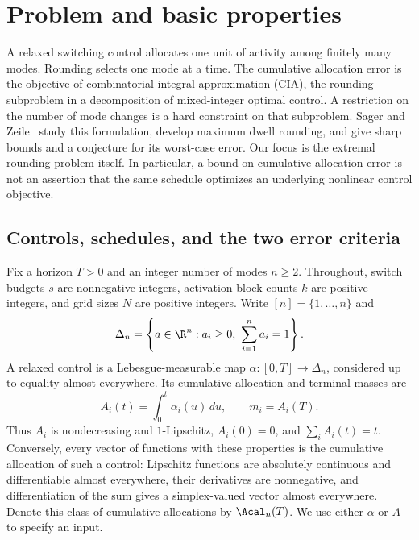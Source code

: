 \section{Problem and basic properties}\label{sec:foundations}

A relaxed switching control allocates one unit of activity among finitely many
modes. Rounding selects one mode at a time. The cumulative allocation error is
the objective of combinatorial integral approximation (CIA), the rounding
subproblem in a decomposition of mixed-integer optimal control. A restriction
on the number of mode changes is a hard constraint on that subproblem.
Sager and Zeile~\cite{sager-zeile2021} study this formulation, develop maximum
dwell rounding, and give sharp bounds and a conjecture for its worst-case
error. Our focus is the extremal rounding problem itself. In particular, a
bound on cumulative allocation error is not an assertion that the same
schedule optimizes an underlying nonlinear control objective.

\subsection{Controls, schedules, and the two error criteria}

Fix a horizon $T>0$ and an integer number of modes $n\ge2$. Throughout,
switch budgets $s$ are nonnegative integers, activation-block counts $k$ are
positive integers, and grid sizes $N$ are positive integers. Write
$[n]=\{1,\ldots,n\}$ and
\[
 \Delta_n=\left\{a\in\R^n:a_i\ge0,\ \sum_{i=1}^n a_i=1\right\}.
\]
A relaxed control is a Lebesgue-measurable map
$\alpha:[0,T]\to\Delta_n$, considered up to equality almost everywhere.
Its cumulative allocation and terminal masses are
\begin{equation}\label{eq:cumulatives}
 A_i(t)=\int_0^t\alpha_i(u)\,du,\qquad m_i=A_i(T).
\end{equation}
Thus $A_i$ is nondecreasing and $1$-Lipschitz, $A_i(0)=0$, and
$\sum_i A_i(t)=t$. Conversely, every vector of functions with these properties
is the cumulative allocation of such a control: Lipschitz functions are
absolutely continuous and differentiable almost everywhere, their derivatives
are nonnegative, and differentiation of the sum gives a simplex-valued
vector almost everywhere. Denote this class of cumulative allocations by
$\Acal_n(T)$. We use either $\alpha$ or $A$ to specify an input.

